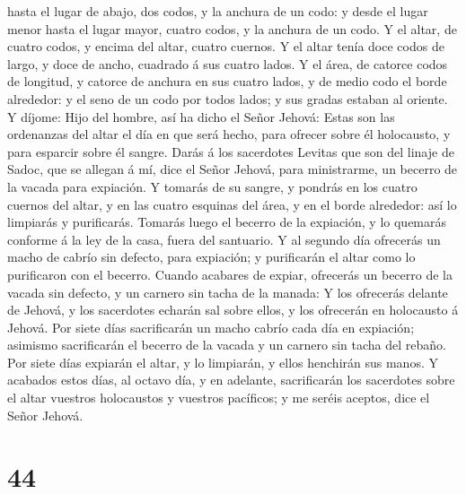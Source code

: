 hasta el lugar de abajo, dos codos, y la anchura de un codo: y desde el
lugar menor hasta el lugar mayor, cuatro codos, y la anchura de un codo.
 Y el altar, de cuatro codos, y encima del altar, cuatro
cuernos.  Y el altar tenía doce codos de largo, y doce de
ancho, cuadrado á sus cuatro lados.  Y el área, de
catorce codos de longitud, y catorce de anchura en sus cuatro lados, y
de medio codo el borde alrededor: y el seno de un codo por todos lados;
y sus gradas estaban al oriente.  Y díjome: Hijo del
hombre, así ha dicho el Señor Jehová: Estas son las ordenanzas del altar
el día en que será hecho, para ofrecer sobre él holocausto, y para
esparcir sobre él sangre.  Darás á los sacerdotes Levitas
que son del linaje de Sadoc, que se allegan á mí, dice el Señor Jehová,
para ministrarme, un becerro de la vacada para expiación.
 Y tomarás de su sangre, y pondrás en los cuatro cuernos
del altar, y en las cuatro esquinas del área, y en el borde alrededor:
así lo limpiarás y purificarás.  Tomarás luego el becerro
de la expiación, y lo quemarás conforme á la ley de la casa, fuera del
santuario.  Y al segundo día ofrecerás un macho de cabrío
sin defecto, para expiación; y purificarán el altar como lo purificaron
con el becerro.  Cuando acabares de expiar, ofrecerás un
becerro de la vacada sin defecto, y un carnero sin tacha de la manada:
 Y los ofrecerás delante de Jehová, y los sacerdotes
echarán sal sobre ellos, y los ofrecerán en holocausto á Jehová.
 Por siete días sacrificarán un macho cabrío cada día en
expiación; asimismo sacrificarán el becerro de la vacada y un carnero
sin tacha del rebaño.  Por siete días expiarán el altar,
y lo limpiarán, y ellos henchirán sus manos.  Y acabados
estos días, al octavo día, y en adelante, sacrificarán los sacerdotes
sobre el altar vuestros holocaustos y vuestros pacíficos; y me seréis
aceptos, dice el Señor Jehová.

\hypertarget{section-43}{%
\section{44}\label{section-43}}


